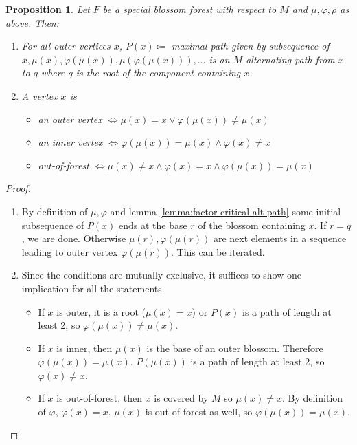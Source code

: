 \documentclass[11pt, a4paper]{article}
\newtheorem{prop}[theorem]{Proposition}
\theoremstyle{remark}
\theoremstyle{definition}
\begin{document}
\begin{prop}\label{special-blossom-forest-repr}
	Let $F$ be a special blossom forest with respect to $M$ and
	$\mu,\varphi,\rho$ as above. Then:
	\begin{enumerate}
		\item
		For all outer vertices $x$, $P(x)\coloneqq$
		maximal path given by subsequence of
		$x,\mu(x),\varphi(\mu(x)),\mu(\varphi(\mu(x))),\ldots$
		is an $M$-alternating path from $x$ to $q$ where $q$ is the root
		of the component containing $x$.

		\item
		A vertex $x$ is
		\begin{itemize}
			\item
			an outer vertex $\Leftrightarrow \mu(x)=x\lor
				\varphi(\mu(x))\neq\mu(x)$
			\item
			an inner vertex $\Leftrightarrow \varphi(\mu(x))=\mu(x)
				\land \varphi(x)\neq x$
			\item
			out-of-forest $\Leftrightarrow \mu(x)\neq x \land \varphi(x)=x
				\land \varphi(\mu(x))=\mu(x)$
		\end{itemize}
	\end{enumerate}
\end{prop}
\begin{proof}\
	\begin{enumerate}
		\item
		By definition of $\mu,\varphi$ and lemma \ref{lemma:factor-critical-alt-path}
		some initial subsequence of $P(x)$ ends at the base $r$ of the blossom
		containing $x$. If $r=q$, we are done. Otherwise $\mu(r),\varphi(\mu(r))$
		are next elements in a sequence leading to outer vertex $\varphi(\mu(r))$.
		This can be iterated.

		\item
		Since the conditions are mutually exclusive, it suffices to
		show one implication for all the statements.
		\begin{itemize}
			\item
			If $x$ is outer, it is a root ($\mu(x)=x$) or $P(x)$ is a path of length
			at least 2, so $\varphi(\mu(x))\neq\mu(x)$.

			\item
			If $x$ is inner, then $\mu(x)$ is the base of an outer blossom.
			Therefore $\varphi(\mu(x))=\mu(x)$. $P(\mu(x))$ is a path of length
			at least 2, so $\varphi(x)\neq x$.

			\item
			If $x$ is out-of-forest, then $x$ is covered by $M$ so $\mu(x)\neq x$.
			By definition of $\varphi$, $\varphi(x)=x$. $\mu(x)$ is out-of-forest
			as well, so $\varphi(\mu(x))=\mu(x)$.
		\end{itemize}
	\end{enumerate}
\end{proof}
\end{document}
